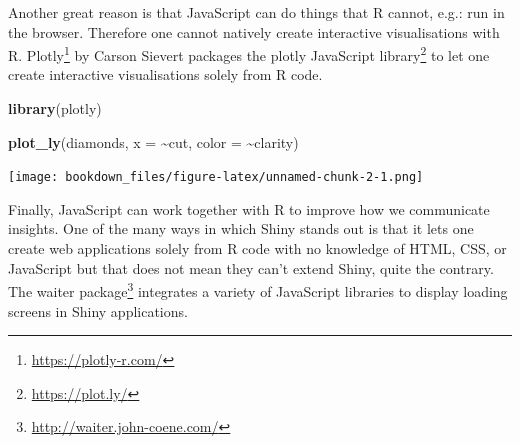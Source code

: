 \documentclass[
]{krantz}
\makeatletter
\newenvironment{Shaded}{\begin{snugshade}}{\end{snugshade}}
\newcommand{\CommentTok}[1]{\textcolor[rgb]{0.37,0.37,0.37}{\textit{#1}}}
\newcommand{\ControlFlowTok}[1]{\textcolor[rgb]{0.27,0.27,0.27}{\textbf{#1}}}
\newcommand{\DataTypeTok}[1]{\textcolor[rgb]{0.27,0.27,0.27}{#1}}
\newcommand{\DecValTok}[1]{\textcolor[rgb]{0.06,0.06,0.06}{#1}}
\newcommand{\KeywordTok}[1]{\textcolor[rgb]{0.27,0.27,0.27}{\textbf{#1}}}
\newcommand{\NormalTok}[1]{#1}
\newcommand{\OperatorTok}[1]{\textcolor[rgb]{0.43,0.43,0.43}{\textbf{#1}}}
\newcommand{\StringTok}[1]{\textcolor[rgb]{0.5,0.5,0.5}{#1}}
\renewcommand{\href}[2]{#2\footnote{\url{#1}}}
\newenvironment{kframe}{%
\medskip{}
\setlength{\fboxsep}{.8em}
 \def\at@end@of@kframe{}%
 \ifinner\ifhmode%
  \def\at@end@of@kframe{\end{minipage}}%
  \begin{minipage}{\columnwidth}%
 \fi\fi%
 \def\FrameCommand##1{\hskip\@totalleftmargin \hskip-\fboxsep
 \colorbox{shadecolor}{##1}\hskip-\fboxsep
     \hskip-\linewidth \hskip-\@totalleftmargin \hskip\columnwidth}%
 \MakeFramed {\advance\hsize-\width
   \@totalleftmargin\z@ \linewidth\hsize
   \@setminipage}}%
 {\par\unskip\endMakeFramed%
 \at@end@of@kframe}
\renewenvironment{Shaded}{\begin{kframe}}{\end{kframe}}
\makeatother
\begin{document}
Another great reason is that JavaScript can do things that R cannot, e.g.: run in the browser. Therefore one cannot natively create interactive visualisations with R. \href{https://plotly-r.com/}{Plotly} \citep{R-plotly} by Carson Sievert packages the \href{https://plot.ly/}{plotly JavaScript library} to let one create interactive visualisations solely from R code.

\begin{Shaded}
\begin{Highlighting}[]
\KeywordTok{library}\NormalTok{(plotly)}

\KeywordTok{plot\_ly}\NormalTok{(diamonds, }\DataTypeTok{x =} \OperatorTok{\textasciitilde{}}\NormalTok{cut, }\DataTypeTok{color =} \OperatorTok{\textasciitilde{}}\NormalTok{clarity)}
\end{Highlighting}
\end{Shaded}

\texttt{[image: bookdown\_files/figure-latex/unnamed-chunk-2-1.png]}

Finally, JavaScript can work together with R to improve how we communicate insights. One of the many ways in which Shiny stands out is that it lets one create web applications solely from R code with no knowledge of HTML, CSS, or JavaScript but that does not mean they can't extend Shiny, quite the contrary. The \href{http://waiter.john-coene.com/}{waiter package} \citep{R-waiter} integrates a variety of JavaScript libraries to display loading screens in Shiny applications.

\begin{Shaded}
\end{Shaded}
\end{document}
